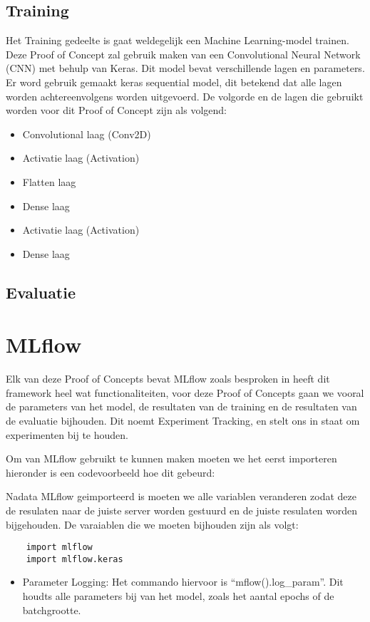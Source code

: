 \subsection{Training}
Het Training gedeelte is gaat weldegelijk een Machine Learning-model trainen. Deze Proof of Concept zal gebruik maken van een Convolutional Neural Network (CNN) met behulp van Keras. Dit model bevat verschillende lagen en parameters.
Er word gebruik gemaakt keras sequential model, dit betekend dat alle lagen worden achtereenvolgens worden uitgevoerd. De volgorde en de lagen die gebruikt worden voor dit Proof of Concept zijn als volgend:
\begin{itemize}
    \item Convolutional laag (Conv2D)
    \item Activatie laag (Activation)
    \item Flatten laag
    \item Dense laag
    \item Activatie laag (Activation)
    \item Dense laag
\end{itemize}
\subsection{Evaluatie}

\section*{MLflow}
Elk van deze Proof of Concepts bevat MLflow zoals besproken in heeft dit framework heel wat functionaliteiten, voor deze Proof of Concepts gaan we vooral de parameters van het model, de resultaten van de training en de resultaten van de evaluatie bijhouden.
Dit noemt Experiment Tracking, en stelt ons in staat om experimenten bij te houden.

Om van MLflow gebruikt te kunnen maken moeten we het eerst importeren hieronder is een codevoorbeeld hoe dit gebeurd:

Nadata MLflow geimporteerd is moeten we alle variablen veranderen zodat deze de resulaten naar de juiste server worden gestuurd en de juiste resulaten worden bijgehouden.
De varaiablen die we moeten bijhouden zijn als volgt:
\begin{verbatim}
    import mlflow
    import mlflow.keras
\end{verbatim}

\begin{itemize}
    \item Parameter Logging: Het commando hiervoor is ``mflow().log\_param''. Dit houdts alle parameters bij van het model, zoals het aantal epochs of de batchgrootte.
\end{itemize}

